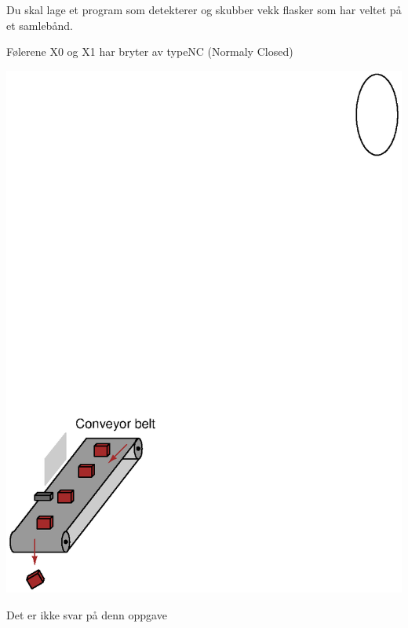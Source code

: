 

Du skal lage et program som detekterer og skubber vekk flasker som
har veltet på et samlebånd. 

Følerene X0 og X1 har bryter av typeNC (Normaly Closed) 

\includegraphics[width=1\textwidth]{i08002x01.eps}





Det er ikke svar på denn oppgave












